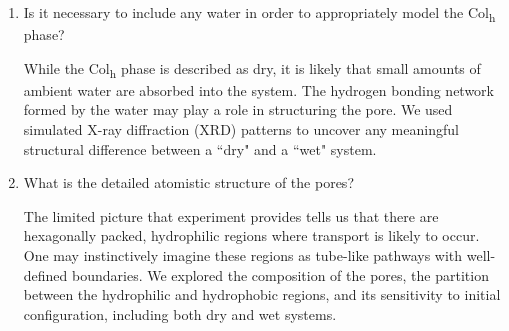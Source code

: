\documentclass[journal=jpcbfk,manuscript=article]{achemso}
\begin{document}
\begin{enumerate}
        \item Is it necessary to include any water in order to appropriately model the 
        Col\textsubscript{h} phase? \label{point:water}

	While the Col\textsubscript{h} phase is described as dry, it is likely
	that small amounts of ambient water are absorbed into the system. The hydrogen
	bonding network formed by the water may play a role in structuring the pore. We
	used simulated X-ray diffraction (XRD) patterns to uncover any 
	meaningful structural difference between a ``dry" and a ``wet" system.

	\item What is the detailed atomistic structure of the pores?\label{point:composition}

	The limited picture that experiment provides tells us that there are hexagonally packed, 
	hydrophilic regions where transport is likely to occur. One may instinctively imagine these 
	regions as tube-like pathways with well-defined boundaries. We explored the composition
	of the pores, the partition between the hydrophilic and hydrophobic regions, and its 
	sensitivity to initial configuration, including both dry and wet systems. 

  \end{enumerate}
  
%
\end{document}
